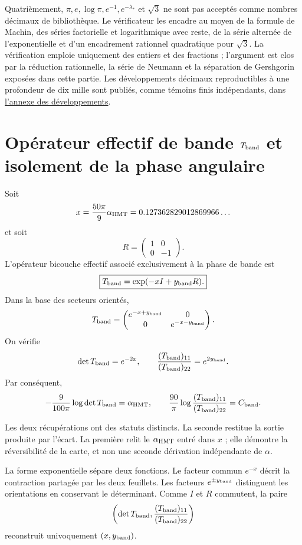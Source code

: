 Quatrièmement, \(\pi,e,\log\pi,e^{-1},e^{-\lambda_*}\) et \(\sqrt3\) ne sont pas
acceptés comme nombres décimaux de bibliothèque. Le vérificateur les encadre au moyen de
la formule de Machin, des séries factorielle et logarithmique avec reste, de la
série alternée de l’exponentielle et d’un encadrement rationnel quadratique pour
\(\sqrt3\). La vérification emploie uniquement des entiers et des fractions ;
l’argument est clos par la réduction rationnelle, la série de Neumann et
la séparation de Gershgorin exposées dans cette partie. Les développements
décimaux reproductibles à une profondeur de dix mille sont publiés, comme témoins
finis indépendants, dans
\hyperref[app:desarrollos-10000-rev9]{l’annexe des développements}.

\section{Opérateur effectif de bande \texorpdfstring{\(T_{\rm band}\)}{Tband} et isolement de la phase angulaire}

Soit
\[
 x=\frac{50\pi}{9}\alpha_{\rm HMT}
 =0.127362829012869966\ldots
\]
et soit
\[
 R=\begin{pmatrix}1&0\\0&-1\end{pmatrix}.
\]
L’opérateur bicouche effectif associé exclusivement à la phase de bande est
\[
 \boxed{T_{\rm band}=\exp(-xI+y_{\rm band}R).}
\]
Dans la base des secteurs orientés,
\[
 T_{\rm band}
 =\begin{pmatrix}
 e^{-x+y_{\rm band}}&0\\
 0&e^{-x-y_{\rm band}}
 \end{pmatrix}.
\]
On vérifie
\[
 \det T_{\rm band}=e^{-2x},
 \qquad
 \frac{(T_{\rm band})_{11}}{(T_{\rm band})_{22}}
 =e^{2y_{\rm band}}.
\]
Par conséquent,
\[
 -\frac9{100\pi}\log\det T_{\rm band}=\alpha_{\rm HMT},
 \qquad
 \frac{90}{\pi}
 \log\frac{(T_{\rm band})_{11}}{(T_{\rm band})_{22}}
 =C_{\rm band}.
\]

Les deux récupérations ont des statuts distincts. La seconde restitue la
sortie produite par l’écart. La première relit le
\(\alpha_{\rm HMT}\) entré dans \(x\) ; elle démontre la réversibilité de la
carte, et non une seconde dérivation indépendante de \(\alpha\).

La forme exponentielle sépare deux fonctions. Le facteur commun \(e^{-x}\)
décrit la contraction partagée par les deux feuillets. Les facteurs
\(e^{\pm y_{\rm band}}\) distinguent les orientations en conservant le déterminant. Comme
\(I\) et \(R\) commutent, la paire
\[
 \left(\det T_{\rm band},
 \frac{(T_{\rm band})_{11}}{(T_{\rm band})_{22}}\right)
\]
reconstruit univoquement \((x,y_{\rm band})\).

